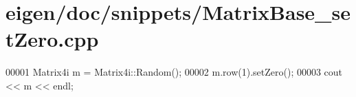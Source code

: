 \hypertarget{eigen_2doc_2snippets_2_matrix_base__set_zero_8cpp_source}{}\section{eigen/doc/snippets/\+Matrix\+Base\+\_\+set\+Zero.cpp}
\label{eigen_2doc_2snippets_2_matrix_base__set_zero_8cpp_source}

\begin{DoxyCode}
00001 Matrix4i m = Matrix4i::Random();
00002 m.row(1).setZero();
00003 cout << m << endl;
\end{DoxyCode}
